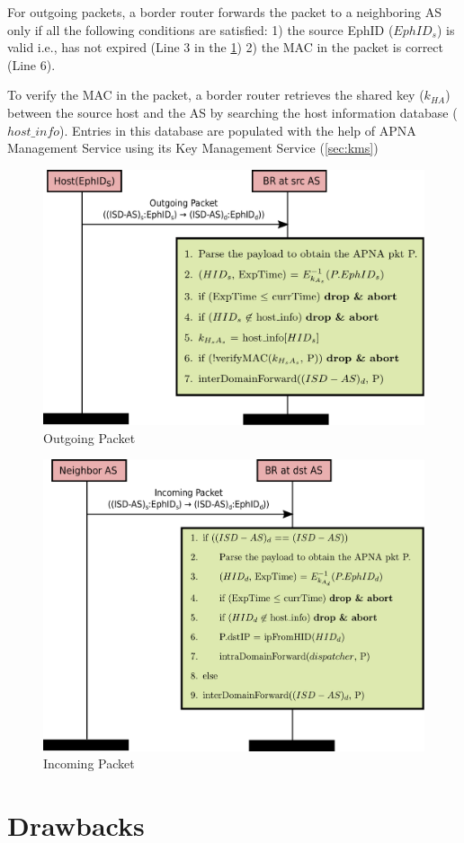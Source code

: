 For outgoing packets, a border router forwards the packet to a neighboring AS only if all the following conditions are satisfied: 1) the source EphID ($EphID_{s}$) is valid i.e., has not expired (Line 3 in the \ref{fig:overlay_src}) 2) the MAC in the packet is correct (Line 6).

To verify the MAC in the packet, a border router retrieves the shared key ($k_{HA}$) between the source host and the AS by searching the host information database ($host\_info$). Entries in this database are populated with the help of APNA Management Service using its Key Management Service (\ref{sec:kms})

\begin{figure}[th!!]
\centering
\hspace*{2cm}\includegraphics[scale=0.5]{Figures/overlay_src.pdf}
\decoRule
\caption[Apna Overlay Outgoing Packet]{Outgoing Packet}
\label{fig:overlay_src}
\end{figure}

\begin{figure}[th!!]
\centering
\hspace*{2cm}\includegraphics[scale=0.5]{Figures/overlay_dst.pdf}
\decoRule
\caption[Apna Overlay Incoming Packet]{Incoming Packet}
\label{fig:overlay_dst}
\end{figure}

\section{Drawbacks} \label{overlay:drawback}
